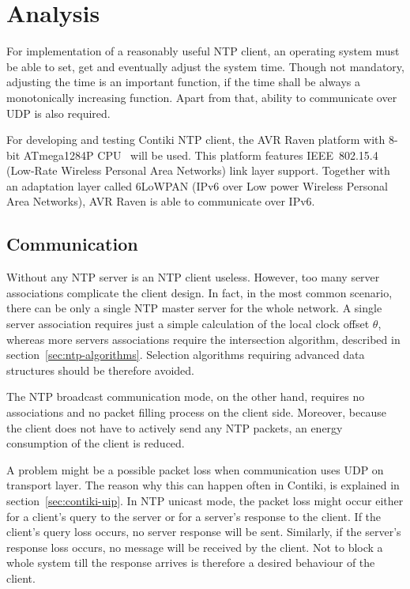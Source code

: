 
\chapter{Analysis}
For implementation of a reasonably useful NTP client,
an operating system must be able to set, get and eventually adjust the system time.
Though not mandatory, adjusting the time is an important function,
if the time shall be always a monotonically increasing function.
Apart from that, ability to communicate over UDP is also required.

For developing and testing Contiki NTP client,
the AVR Raven platform with 8-bit ATmega1284P CPU~\cite{avr-datasheet} will be used.
This platform features IEEE~802.15.4 (Low-Rate Wireless Personal Area Networks) link layer support.
Together with an adaptation layer called 6LoWPAN (IPv6 over Low power Wireless Personal Area Networks),
AVR Raven is able to communicate over IPv6.






\section{Communication}
Without any NTP server is an NTP client useless. %
However, too many server associations complicate the client design.
In fact, in the most common scenario, there can be only a single NTP master server
for the whole network.
A single server association requires just a simple calculation of the local clock offset
$\theta$, whereas more servers associations require the intersection algorithm,
described in section~\ref{sec:ntp-algorithms}.
Selection algorithms requiring advanced data structures should be therefore avoided.

The NTP broadcast communication mode, on the other hand,
requires no associations and no packet filling process on the client side.
Moreover, because the client does not have to actively send any NTP packets,
an energy consumption of the client is reduced.

A problem might be a possible packet loss when communication uses UDP on transport layer.
The reason why this can happen often in Contiki, is explained in section~\ref{sec:contiki-uip}.
In NTP unicast mode, the packet loss might occur either for a client's query to the server
or for a server's response to the client.
If the client's query loss occurs, no server response will be sent.
Similarly, if the server's response loss occurs, no message will be received by the client.
Not to block a whole system till the response arrives
is therefore a desired behaviour of the client.

